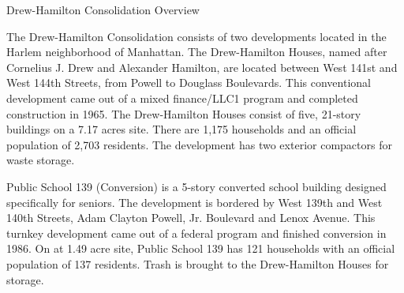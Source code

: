 Drew-Hamilton Consolidation Overview

The Drew-Hamilton Consolidation consists of two developments located in the Harlem neighborhood of Manhattan. The Drew-Hamilton Houses, named after Cornelius J. Drew and Alexander Hamilton, are located between West 141st and West 144th Streets, from Powell to Douglass Boulevards. This conventional development came out of a mixed finance/LLC1 program and completed construction in 1965. The Drew-Hamilton Houses consist of five, 21-story buildings on a 7.17 acres site. There are 1,175 households and an official population of 2,703 residents. The development has two exterior compactors for waste storage.

Public School 139 (Conversion) is a 5-story converted school building designed specifically for seniors. The development is bordered by West 139th and West 140th  Streets, Adam Clayton Powell, Jr. Boulevard and Lenox Avenue. This turnkey development came out of a federal program and finished conversion in 1986. On at 1.49 acre site, Public School 139 has 121 households with an official population of 137 residents. Trash is brought to the Drew-Hamilton Houses for storage. 